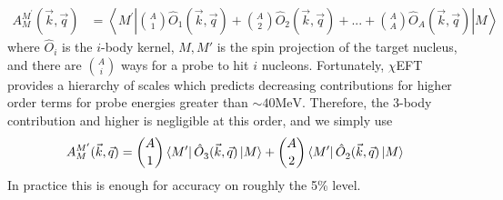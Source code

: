 \documentclass[a4paper,11pt]{article}
\newcommand\bv[1]{\vec{#1}}
\newcommand{\MeV}{\mathrm{MeV}}
\begin{document}
\begin{align}
  A_{M}^{M^{\prime} }(\bv{k}, \bv{q})&=
 \left\langle M^{\prime}\left|
  \binom{A}{1} \hat{O}_{1}(\bv{k}, \bv{q}) +
  \binom{A}{2} \hat{O}_{2}(\bv{k}, \bv{q}) +... + 
  \binom{A}{A} \hat{O}_{A}(\bv{k}, \bv{q})
  \right|M
  \right\rangle
\end{align}
where $\hat{O}_i$ is the $i$-body kernel, $M,M'$ is the spin projection of the
target nucleus, and there are
$\binom{A}{i}$ ways for a probe to hit $i$ nucleons. Fortunately,
$\chi$EFT provides a hierarchy of scales which predicts decreasing
contributions for higher order terms for probe energies greater than
$\sim 40 \MeV$.
Therefore, the 3-body contribution and higher is negligible at this
order, and we simply use
\begin{equation}
  A_{M}^{M^{\prime} }(\bv{k}, \bv{q})=\binom{A}{1}\left\langle
  M^{\prime}\right|\hat{O}_{3}^{}(\bv{k}, \bv{q})\left|M\right
  \rangle + \binom{A}{2} \left\langle
  M^{\prime}\right|\hat{O}_{2}^{}(\bv{k}, \bv{q}) \left|
  M\right\rangle\nonumber\\
\end{equation}
In practice this is enough for accuracy on roughly the 5\% level.
\end{document}
